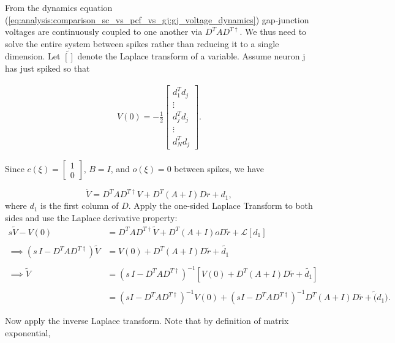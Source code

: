 From the dynamics equation (\ref{eq:analysis:comparison_sc_vs_pcf_vs_gj:gj_voltage_dynamics}) gap-junction voltages are continuously coupled to one another via $D^T A D^{T \dagger}$. We thus need to solve the entire system between spikes rather than reducing it to a single dimension. Let $\tilde{[]}$ denote the Laplace transform of a variable. Assume neuron j has just spiked so that 

\begin{align*}
V(0) = -\frac{1}{2}
\begin{bmatrix}
d_1 ^T d_j
\\
\vdots
\\
d_j^T d_j
\\
\vdots
\\
d_N^T d_j
\end{bmatrix}.
\end{align*}

Since $c(\xi) = \begin{bmatrix}
1 \\ 0
\end{bmatrix}$, $B = I$, and $o(\xi) = 0$ between spikes, we have

$$
	\dot{V} 
	=
	D^T A D^{T \dagger} V
	+ 
	D^T 
	\left(
		A + I
	\right)
	D r
	+
	d_1,
$$
where $d_1$ is the first column of $D$. 
Apply the one-sided Laplace Transform to both sides and use the Laplace derivative property:
\begin{align*}
	s \tilde{V} - V(0)
	&=
	D^T A D^{T \dagger} \tilde{V}
	+
	D^T 
	\left(
		A + I
	\right)o
	D \tilde{r}
	+
	\mathcal{L}\left[d_1\right]
	\\
	\\
	\implies
	\left(
	s \, I - D^T A D^{T \dagger} 
	\right)
	\tilde{V}
	&=
	V(0)
	+
		D^T 
	\left(
		A + I
	\right)
	D \tilde{r}
	+
	\tilde{d_1}	
	\\
	\\
	\implies 
	\tilde{V}
	&= 
	\left(
	s \, I - D^T A D^{T \dagger} 
	\right)^{-1}
	\left[
		V(0)
		+
		D^T 
		\left(
			A + I
		\right)
		D \tilde{r}
		+
		\tilde{d_1}	
	\right]
	\\
	\\
	&= 
	\left(
		sI - D^T A D^{T \dagger}
	\right)^{-1}
	V(0)
	+ 
		\left(
		sI - D^T A D^{T \dagger}
	\right)^{-1}
	D^T 
	\left(
		A + I
	\right)	
	D \tilde{r}
	+
	\tilde(d_1).
\end{align*}

Now apply the inverse Laplace transform. Note that by definition of matrix exponential, 

